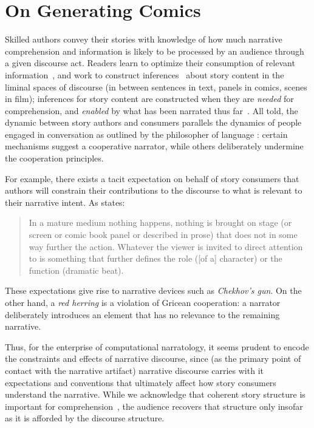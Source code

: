 \section{On Generating Comics}

Skilled authors convey their stories with knowledge of how much narrative
comprehension and information is likely to be processed by an audience
through a given discourse act.
Readers learn to optimize their consumption of
relevant information~\cite{pirolli2007information}, and work to construct
inferences~\cite{magliano2016filling} about story content in the liminal spaces
of discourse (in between sentences in text, panels in comics, scenes in film);
inferences for story content are constructed when they are \emph{needed} for
comprehension, and \emph{enabled} by what has been narrated thus
far~\cite{myers1987degree}. All told, the dynamic between story authors and
consumers parallels the dynamics of people engaged in conversation as
outlined by the philosopher of language : certain
mechanisms suggest a cooperative narrator, while others deliberately
undermine the cooperation principles.

For example, there 
exists a tacit expectation on behalf of story consumers that authors
will constrain their contributions to the discourse to what is relevant to
their narrative intent. As  states:
%
\begin{quote} 
	In a mature medium nothing happens, nothing is brought on stage (or screen 
	or comic book panel or described in prose) that does not in some way further 
	the action. Whatever the viewer is invited to direct attention to is
	something that further defines the role ([of a] character) or the function 
	(dramatic beat). 
	\end{quote}
%
These expectations give rise to narrative devices such as \emph{Chekhov's
gun}. On the other hand, a \emph{red herring} is a violation of Gricean
cooperation: a narrator deliberately introduces an element that
has no relevance to the remaining narrative.


Thus, for the enterprise of computational narratology, it seems prudent to
encode the constraints and effects of narrative discourse, since (as the
primary point of contact with the narrative artifact) narrative discourse
carries with it expectations and conventions that ultimately affect how
story consumers understand the narrative. While we acknowledge that
coherent story structure is important for
comprehension~\cite{graesser2002how}, the audience recovers that structure
only insofar as it is afforded by the discourse structure. 

